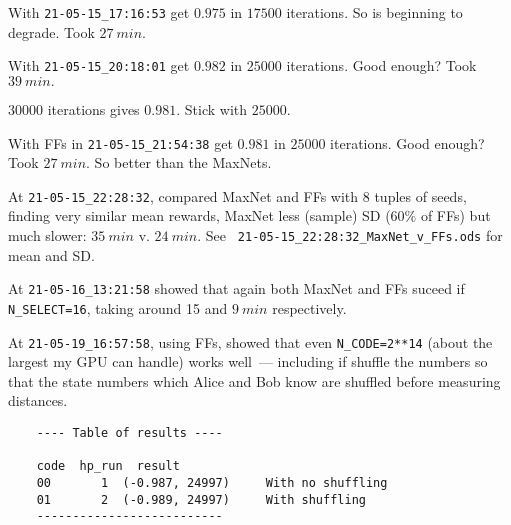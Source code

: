 \documentclass[12pt]{article}
\begin{document}
With \verb|21-05-15_17:16:53| get $0.975$ in $\num{17500}$ iterations.  So is beginning to degrade.  Took $\SI{27}{min}.$

With \verb|21-05-15_20:18:01| get $0.982$ in $\num{25000}$ iterations.  Good enough? Took $\SI{39}{min}.$

$\num{30000}$ iterations gives $0.981.$ Stick with $\num{25000}.$

With FFs in \verb|21-05-15_21:54:38| get $0.981$ in $\num{25000}$ iterations.  Good enough? Took $\SI{27}{min}.$  So better than the MaxNets.

At \verb|21-05-15_22:28:32|, compared MaxNet and FFs with 8 tuples of seeds, finding very similar mean rewards, MaxNet less (sample) SD (60\% of FFs) but much slower: $\SI{35}{min}$ v.  $\SI{24}{min}.$  See \verb| 21-05-15_22:28:32_MaxNet_v_FFs.ods| for mean and SD.

At \verb|21-05-16_13:21:58| showed that again both MaxNet and FFs suceed if \verb|N_SELECT=16|, taking around 15 and $\SI{9}{min}$ respectively.

At \verb|21-05-19_16:57:58|, using FFs, showed that even \verb|N_CODE=2**14| (about the largest my GPU can handle) works well~--- including if shuffle the numbers so that the state numbers which Alice and Bob know are shuffled before measuring distances.

\begin{lstlisting}
	---- Table of results ----
	
	code  hp_run  result
	00       1  (-0.987, 24997)		With no shuffling
	01       2  (-0.989, 24997)		With shuffling
	--------------------------
\end{lstlisting}
\end{document}
